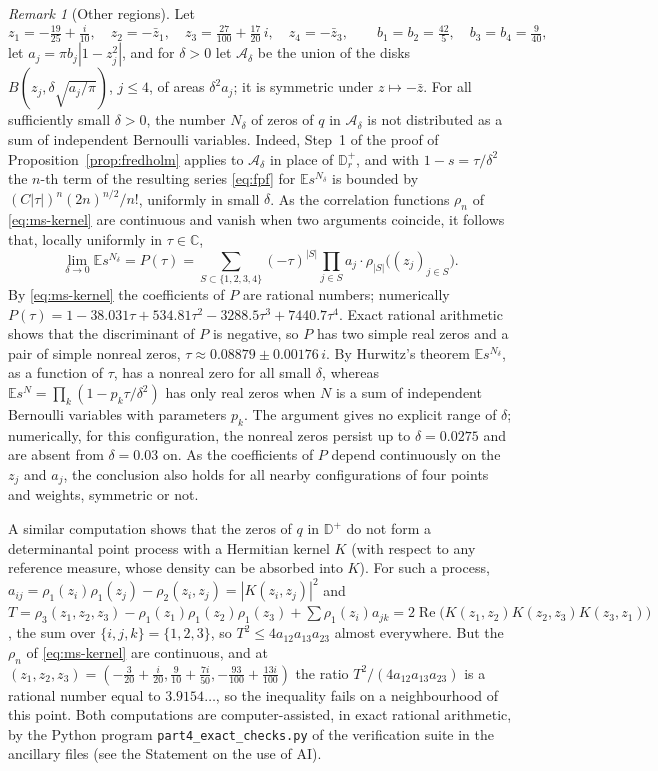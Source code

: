 \documentclass[11pt]{amsart}
\theoremstyle{definition}
\theoremstyle{remark}
\newtheorem{remark}[theorem]{Remark}
\numberwithin{equation}{section}
\newcommand{\C}{\mathbb{C}}
\newcommand{\D}{\mathbb{D}}
\newcommand{\E}{\mathbb{E}}
\DeclareMathOperator{\re}{Re}
\begin{document}
\begin{remark}[Other regions]\label{rem:bernoulli-general}
Let
\[
z_1=-\tfrac{19}{25}+\tfrac{i}{10},\quad z_2=-\bar z_1,\quad z_3=\tfrac{27}{100}+\tfrac{17}{20}\,i,\quad z_4=-\bar z_3,\qquad b_1=b_2=\tfrac{42}5,\quad b_3=b_4=\tfrac9{40},
\]
let $a_j=\pi b_j|1-z_j^2|$, and for $\delta>0$ let $\mathcal A_\delta$ be the union of the disks $B(z_j,\delta\sqrt{a_j/\pi})$, $j\le4$, of areas $\delta^2a_j$; it is symmetric under $z\mapsto-\bar z$. For all sufficiently small $\delta>0$, the number $N_\delta$ of zeros of $q$ in $\mathcal A_\delta$ is not distributed as a sum of independent Bernoulli variables. Indeed, Step~1 of the proof of Proposition~\ref{prop:fredholm} applies to $\mathcal A_\delta$ in place of $\D_r^+$, and with $1-s=\tau/\delta^2$ the $n$-th term of the resulting series \eqref{eq:fpf} for $\E s^{N_\delta}$ is bounded by $(C|\tau|)^n(2n)^{n/2}/n!$, uniformly in small $\delta$. As the correlation functions $\rho_n$ of \eqref{eq:ms-kernel} are continuous and vanish when two arguments coincide, it follows that, locally uniformly in $\tau\in\C$,
\[
\lim_{\delta\to0}\E s^{N_\delta}=P(\tau)=\sum_{S\subset\{1,2,3,4\}}(-\tau)^{|S|}\prod_{j\in S}a_j\cdot\rho_{|S|}\bigl((z_j)_{j\in S}\bigr).
\]
By \eqref{eq:ms-kernel} the coefficients of $P$ are rational numbers; numerically $P(\tau)=1-38.031\tau+534.81\tau^2-3288.5\tau^3+7440.7\tau^4$. Exact rational arithmetic shows that the discriminant of $P$ is negative, so $P$ has two simple real zeros and a pair of simple nonreal zeros, $\tau\approx0.08879\pm0.00176\,i$. By Hurwitz's theorem $\E s^{N_\delta}$, as a function of $\tau$, has a nonreal zero for all small $\delta$, whereas $\E s^N=\prod_k(1-p_k\tau/\delta^2)$ has only real zeros when $N$ is a sum of independent Bernoulli variables with parameters $p_k$. The argument gives no explicit range of $\delta$; numerically, for this configuration, the nonreal zeros persist up to $\delta=0.0275$ and are absent from $\delta=0.03$ on. As the coefficients of $P$ depend continuously on the $z_j$ and $a_j$, the conclusion also holds for all nearby configurations of four points and weights, symmetric or not.

A similar computation shows that the zeros of $q$ in $\D^+$ do not form a determinantal point process with a Hermitian kernel $K$ (with respect to any reference measure, whose density can be absorbed into $K$). For such a process, $a_{ij}=\rho_1(z_i)\rho_1(z_j)-\rho_2(z_i,z_j)=|K(z_i,z_j)|^2$ and $T=\rho_3(z_1,z_2,z_3)-\rho_1(z_1)\rho_1(z_2)\rho_1(z_3)+\sum\rho_1(z_i)a_{jk}=2\re\bigl(K(z_1,z_2)K(z_2,z_3)K(z_3,z_1)\bigr)$, the sum over $\{i,j,k\}=\{1,2,3\}$, so $T^2\le4a_{12}a_{13}a_{23}$ almost everywhere. But the $\rho_n$ of \eqref{eq:ms-kernel} are continuous, and at $(z_1,z_2,z_3)=(-\frac3{20}+\frac i{20},\frac9{10}+\frac{7i}{50},-\frac{93}{100}+\frac{13i}{100})$ the ratio $T^2/(4a_{12}a_{13}a_{23})$ is a rational number equal to $3.9154\ldots$, so the inequality fails on a neighbourhood of this point. Both computations are computer-assisted, in exact rational arithmetic, by the Python program \texttt{part4\_exact\_checks.py} of the verification suite in the ancillary files (see the Statement on the use of AI).
\end{remark}
\end{document}
